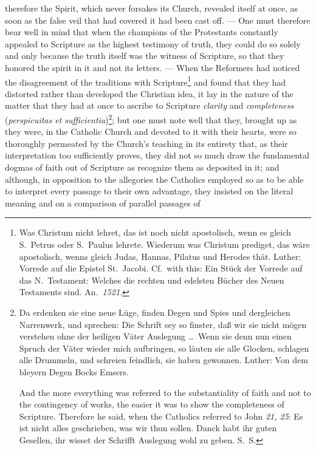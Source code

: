 \documentclass[12pt]{book}
\newcommand{\opage}[1]{\marginnote{\footnotesize\textit{[#1]}}}
\begin{document}
therefore the Spirit, which never forsakes its Church, revealed itself at once,
as soon as the false veil that had covered it had been cast off. --- One must
therefore bear well in mind that when the champions of the Protestants
constantly appealed to Scripture as the highest testimony of truth, they could
do so solely and only because the truth itself was the witness of Scripture, so
that they honored the spirit in it and not its letters. --- When the Reformers
had noticed the disagreement of the traditions with
Scripture\footnote{Was Christum nicht lehret, das ist noch nicht apostolisch,
wenn es gleich S.~Petrus oder S.~Paulus lehrete. Wiederum was Christum prediget,
das wäre apostolisch, wenns gleich Judas, Hannas, Pilatus und Herodes thät.
Luther: Vorrede auf die Epistel St.~Jacobi. Cf.\ with this: Ein Stück der
Vorrede auf das N.~Testament: Welches die rechten und edelsten Bücher des Neuen
Testaments sind. An.~\textit{1521}.} and found that they had distorted rather
than developed the Christian idea, it lay in the nature of the matter that they
had at once to ascribe to Scripture \emph{clarity} and \emph{completeness}
(\textit{perspicuitas et sufficientia})\footnote{Da erdenken sie eine neue Lüge,
finden Degen und Spies und dergleichen Narrenwerk, und sprechen: Die Schrift sey
so finster, daß wir sie nicht mögen verstehen ohne der heiligen Väter Auslegung
\ldots\ Wenn sie denn nun einen Spruch der Väter wieder mich aufbringen, so
läuten sie alle Glocken, schlagen alle Drummeln, und schreien feindlich, sie
haben gewonnen. Luther: Von dem bleyern Degen Bocks Emsers.

And the more everything was referred to the substantiality of faith and not to
the contingency of works, the easier it was to show the completeness of
Scripture. Therefore he said, when the Catholics referred to John
\textit{21, 25}: Es ist nicht alles geschrieben, was wir thun sollen. Danck habt
ihr guten Gesellen, ihr wisset der Schrifft Auslegung wohl zu geben.
S.~S.}; but one must note well that they, brought up as they
\opage{65} \setcounter{footnote}{0}%
were, in the Catholic Church and devoted to it with their hearts, were so
thoroughly permeated by the Church's teaching in its entirety that, as their
interpretation too sufficiently proves, they did not so much draw the
fundamental dogmas of faith out of Scripture as recognize them as deposited
in it; and although, in opposition to the allegories the Catholics employed
so as to be able to interpret every passage to their own advantage, they
insisted on the literal meaning and on a comparison of parallel passages of
\end{document}
